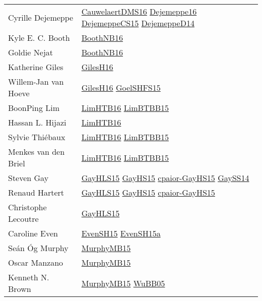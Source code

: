 {\begin{longtable}{p{4cm}p{15cm}}
Cyrille Dejemeppe & \href{papers/CauwelaertDMS16.pdf}{CauwelaertDMS16}\cite{CauwelaertDMS16} \href{}{Dejemeppe16}\cite{Dejemeppe16} \href{papers/DejemeppeCS15.pdf}{DejemeppeCS15}\cite{DejemeppeCS15} \href{papers/DejemeppeD14.pdf}{DejemeppeD14}\cite{DejemeppeD14} \\
Kyle E. C. Booth & \href{papers/BoothNB16.pdf}{BoothNB16}\cite{BoothNB16} \\
Goldie Nejat & \href{papers/BoothNB16.pdf}{BoothNB16}\cite{BoothNB16} \\
Katherine Giles & \href{papers/GilesH16.pdf}{GilesH16}\cite{GilesH16} \\
Willem{-}Jan van Hoeve & \href{papers/GilesH16.pdf}{GilesH16}\cite{GilesH16} \href{articles/GoelSHFS15.pdf}{GoelSHFS15}\cite{GoelSHFS15} \\
BoonPing Lim & \href{papers/LimHTB16.pdf}{LimHTB16}\cite{LimHTB16} \href{papers/LimBTBB15.pdf}{LimBTBB15}\cite{LimBTBB15} \\
Hassan L. Hijazi & \href{papers/LimHTB16.pdf}{LimHTB16}\cite{LimHTB16} \\
Sylvie Thi{\'{e}}baux & \href{papers/LimHTB16.pdf}{LimHTB16}\cite{LimHTB16} \href{papers/LimBTBB15.pdf}{LimBTBB15}\cite{LimBTBB15} \\
Menkes van den Briel & \href{papers/LimHTB16.pdf}{LimHTB16}\cite{LimHTB16} \href{papers/LimBTBB15.pdf}{LimBTBB15}\cite{LimBTBB15} \\
Steven Gay & \href{papers/GayHLS15.pdf}{GayHLS15}\cite{GayHLS15} \href{papers/GayHS15.pdf}{GayHS15}\cite{GayHS15} \href{papers/cpaior-GayHS15.pdf}{cpaior-GayHS15}\cite{cpaior-GayHS15} \href{papers/GaySS14.pdf}{GaySS14}\cite{GaySS14} \\
Renaud Hartert & \href{papers/GayHLS15.pdf}{GayHLS15}\cite{GayHLS15} \href{papers/GayHS15.pdf}{GayHS15}\cite{GayHS15} \href{papers/cpaior-GayHS15.pdf}{cpaior-GayHS15}\cite{cpaior-GayHS15} \\
Christophe Lecoutre & \href{papers/GayHLS15.pdf}{GayHLS15}\cite{GayHLS15} \\
Caroline Even & \href{papers/EvenSH15.pdf}{EvenSH15}\cite{EvenSH15} \href{articles/EvenSH15a.pdf}{EvenSH15a}\cite{EvenSH15a} \\
Se{\'{a}}n {\'{O}}g Murphy & \href{papers/MurphyMB15.pdf}{MurphyMB15}\cite{MurphyMB15} \\
Oscar Manzano & \href{papers/MurphyMB15.pdf}{MurphyMB15}\cite{MurphyMB15} \\
Kenneth N. Brown & \href{papers/MurphyMB15.pdf}{MurphyMB15}\cite{MurphyMB15} \href{papers/WuBB05.pdf}{WuBB05}\cite{WuBB05} \\

\end{longtable}}
